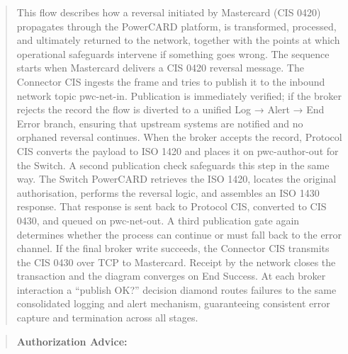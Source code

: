 \documentclass[12pt,a4paper]{report}
\begin{document}
\begin{quote}
This flow describes how a reversal initiated by Mastercard (CIS 0420) propagates through the PowerCARD platform, is transformed, processed, and ultimately returned to the network, together with the points at which operational safeguards intervene if something goes wrong.
The sequence starts when Mastercard delivers a CIS 0420 reversal message. The Connector CIS ingests the frame and tries to publish it to the inbound network topic pwc-net-in. Publication is immediately verified; if the broker rejects the record the flow is diverted to a unified Log → Alert → End Error branch, ensuring that upstream systems are notified and no orphaned reversal continues.
When the broker accepts the record, Protocol CIS converts the payload to ISO 1420 and places it on pwc-author-out for the Switch. A second publication check safeguards this step in the same way.
The Switch PowerCARD retrieves the ISO 1420, locates the original authorisation, performs the reversal logic, and assembles an ISO 1430 response. That response is sent back to Protocol CIS, converted to CIS 0430, and queued on pwc-net-out. A third publication gate again determines whether the process can continue or must fall back to the error channel.
If the final broker write succeeds, the Connector CIS transmits the CIS 0430 over TCP to Mastercard. Receipt by the network closes the transaction and the diagram converges on End Success. At each broker interaction a “publish OK?” decision diamond routes failures to the same consolidated logging and alert mechanism, guaranteeing consistent error capture and termination across all stages.

\end{quote}
\clearpage

\begin{quote}
\textbf{Authorization Advice:}
\end{quote}
\end{document}
